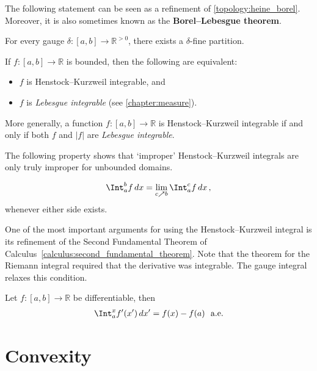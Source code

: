     The following statement can be seen as a refinement of \cref{topology:heine_borel}. Moreover, it is also sometimes known as the \textbf{Borel--Lebesgue theorem}.
    \begin{property}[Cousin]
        For every gauge $\delta:[a,b]\rightarrow\mathbb{R}^{>0}$, there exists a $\delta$-fine partition. 
    \end{property}

    \begin{property}[Integrability]
        If $f:[a,b]\rightarrow\mathbb{R}$ is bounded, then the following are equivalent:
        \begin{itemize}
            \item $f$ is Henstock--Kurzweil integrable, and
            \item $f$ is \textit{Lebesgue integrable} (see \cref{chapter:measure}).
        \end{itemize}
        More generally, a function $f:[a,b]\rightarrow\mathbb{R}$ is Henstock--Kurzweil integrable if and only if both $f$ and $|f|$ are \textit{Lebesgue integrable}.
    \end{property}

    The following property shows that `improper' Henstock--Kurzweil integrals are only truly improper for unbounded domains.
    \begin{property}[Hake]
        \begin{gather}
            \Int_a^bf\,dx = \lim_{c\nearrow b}\Int_a^cf\,dx\,,
        \end{gather}
        whenever either side exists.
    \end{property}

    One of the most important arguments for using the Henstock--Kurzweil integral is its refinement of the Second Fundamental Theorem of Calculus~\ref{calculus:second_fundamental_theorem}. Note that the theorem for the Riemann integral required that the derivative was integrable. The gauge integral relaxes this condition.
    \begin{theorem}
        Let $f:[a,b]\rightarrow\mathbb{R}$ be differentiable, then
        \begin{gather}
            \Int_a^xf'(x')\,dx' = f(x)-f(a)\text{\ \ a.e.}
        \end{gather}
    \end{theorem}

\section{Convexity}

